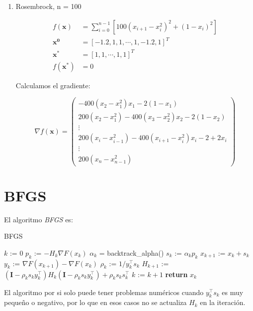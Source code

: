\documentclass{article}
\begin{document}
\begin{multicols}{2}
\begin{enumerate}
\item Rosembrock, n = 100

\begin{align*} 
f(\boldsymbol{x}) &= \sum_{i=0}^{n-1}[100 (x_{i+1} - x_i^2)^2 + (1 - x_i)^2] \\
\boldsymbol{x^0} &= [-1.2, 1, 1, \cdots, 1, -1.2, 1]^T \\
\boldsymbol{x^*} &= [1, 1, \cdots, 1, 1]^T \\
f(\boldsymbol{x^*}) &= 0
\end{align*}

Calculamos el gradiente:

{
\small
$$\nabla f(\boldsymbol{x}) =
 \begin{pmatrix}
  -400(x_2 - x_1^2)x_1 - 2(1 - x_1) \\
  200(x_2 - x_1^2) - 400(x_3 - x_2^2)x_2 - 2(1 - x_2)\\
  \vdots\\
  200(x_{i} - x_{i-1}^2) - 400(x_{i+1} - x_i^2)x_i - 2 + 2x_i\\
  \vdots\\
  200(x_{n} - x_{n-1}^2)
 \end{pmatrix}$$
}
\end{enumerate}

\section{BFGS}

El algoritmo \emph{BFGS} es:

\begin{algorithm}[H]
\caption{BFGS}\label{bfgs}
\begin{algorithmic}[1]
  \State $k$ := $0$
    \State $p_k$ := $-H_k\nabla F(x_k)$
    \State $\alpha_k$ = backtrack\_alpha() 
    \State $s_k$ := $\alpha_k p_k$
    \State $x_{k+1}$ := $x_k + s_k$
    \State $y_k$ := $\nabla F(x_{k+1}) - \nabla F(x_k)$
    \State $\rho_k$ := $1 / y_k^\intercal s_k$
    \State $H_{k+1}$ := $(\boldsymbol{I} - \rho_k s_k y_k^\intercal)H_k(\boldsymbol{I} - \rho_k s_k y_k^\intercal) + \rho_k s_k s_k^\intercal$
    \State $k$ := $k + 1$
  \EndWhile
  \State\textbf{return} $x_k$
\EndFunction
\end{algorithmic}
\end{algorithm}

El algoritmo por si solo puede tener problemas numéricos cuando $y_k^\intercal s_k$ es muy pequeño o negativo, por lo que en esos casos no se actualiza $H_k$ en la iteración.


\end{multicols}
\end{document}
